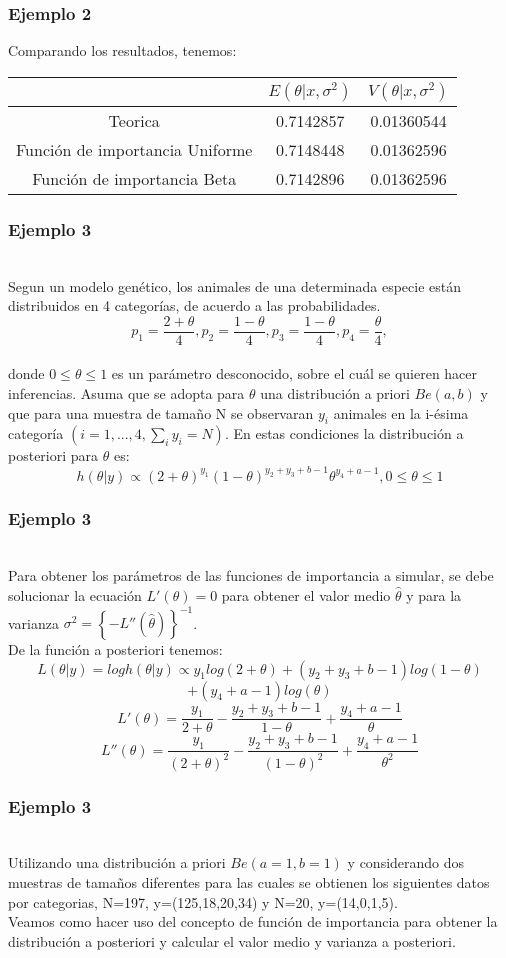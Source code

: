 \documentclass[12pt]{beamer}
\begin{document}
\begin{frame}
\frametitle{Ejemplo 2}
Comparando los resultados, tenemos:
\begin{tabular}{|c|c|c|}
\hline 
 & $E(\theta|x,\sigma^2)$ & $V(\theta|x,\sigma^2)$ \\ 
\hline 
Teorica & 0.7142857 & 0.01360544 \\ 
Función de importancia Uniforme &  0.7148448 & 0.01362596 \\ 
Función de importancia Beta & 0.7142896 & 0.01362596 \\
\hline 
\end{tabular} 
\end{frame}

\begin{frame}
\frametitle{Ejemplo 3}
~\\Segun un modelo genético, los animales de una determinada especie están distribuidos en 4 categorías, de acuerdo a las probabilidades.
$$p_{1}=\frac{2+\theta}{4}, p_{2}=\frac{1-\theta}{4}, p_{3}=\frac{1-\theta}{4}, p_{4}=\frac{\theta}{4},$$
~\\donde $0\leq \theta \leq 1$ es un parámetro desconocido, sobre el cuál se quieren hacer inferencias. Asuma que se adopta para $\theta$ una distribución a priori $Be(a,b)$ y que para una muestra de tamaño N se observaran $y_{i}$ animales en la i-ésima categoría $(i=1,...,4, \sum_{i}y_{i}=N)$. En estas condiciones la distribución a posteriori para $\theta$ es:
$$h(\theta|y)\propto(2+\theta)^{y_{1}}(1-\theta)^{y_{2}+y_{3}+b-1}\theta^{y_{4}+a-1},   0\leq\theta\leq1 $$
\end{frame}

\begin{frame}
\frametitle{Ejemplo 3}
~\\Para obtener los parámetros de las funciones de importancia a simular, se debe solucionar la ecuación $L'(\theta)=0$ para obtener el valor medio $\hat{\theta}$ y  para la varianza $\sigma^2=\left\lbrace -L''(\hat{\theta})\right\rbrace ^{-1}$.
~\\De la función a posteriori tenemos:
$$L(\theta|y)=log h(\theta|y)\propto y_{1}log(2+\theta)+(y_{2}+y_{3}+b-1)log(1-\theta)$$
$$+(y_{4}+a-1)log(\theta)$$
$$L'(\theta)=\frac{y_{1}}{2+\theta}-\frac{y_{2}+y_{3}+b-1}{1-\theta}+\frac{y_{4}+a-1}{\theta}$$
$$L''(\theta)=\frac{y_{1}}{(2+\theta)^2}-\frac{y_{2}+y_{3}+b-1}{(1-\theta)^2}+\frac{y_{4}+a-1}{\theta^2}$$
\end{frame}

\begin{frame}
\frametitle{Ejemplo 3}
~\\Utilizando una distribución a priori $Be(a=1,b=1)$ y considerando dos muestras de tamaños diferentes para las cuales se obtienen los siguientes datos por categorias, N=197, y=(125,18,20,34) y N=20, y=(14,0,1,5).
~\\Veamos como hacer uso del concepto de función de importancia para obtener la distribución a posteriori y calcular el valor medio y varianza a posteriori.
\end{frame}
\end{document}
